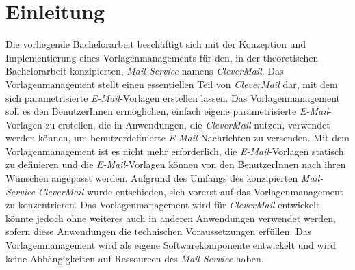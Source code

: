 \chapter{Einleitung}
\label{cha:Einleitung}
Die vorliegende Bachelorarbeit beschäftigt sich mit der Konzeption und Implementierung eines Vorlagenmanagements für den, in der theoretischen Bachelorarbeit konzipierten, \emph{Mail-Service} namens \emph{CleverMail}. Das Vorlagenmanagement stellt einen essentiellen Teil von \emph{CleverMail} dar, mit dem sich parametrisierte \emph{E-Mail}-Vorlagen erstellen lassen. Das Vorlagenmanagement soll es den BenutzerInnen ermöglichen, einfach eigene parametrisierte \emph{E-Mail}-Vorlagen zu erstellen, die in Anwendungen, die \emph{CleverMail} nutzen, verwendet werden können, um benutzerdefinierte \emph{E-Mail}-Nachrichten zu versenden. Mit dem Vorlagenmanagement ist es nicht mehr erforderlich, die \emph{E-Mail}-Vorlagen statisch zu definieren und die \emph{E-Mail}-Vorlagen können von den BenutzerInnen nach ihren Wünschen angepasst werden.
\newline
\newline
Aufgrund des Umfangs des konzipierten \emph{Mail-Service} \emph{CleverMail} wurde entschieden,  sich vorerst auf das Vorlagenmanagement zu konzentrieren. Das Vorlagenmanagement wird für \emph{CleverMail} entwickelt, könnte jedoch ohne weiteres auch in anderen Anwendungen verwendet werden, sofern diese Anwendungen die technischen Voraussetzungen erfüllen. Das Vorlagenmanagement wird als eigene Softwarekomponente entwickelt und wird keine Abhängigkeiten auf Ressourcen des \emph{Mail-Service} haben.

